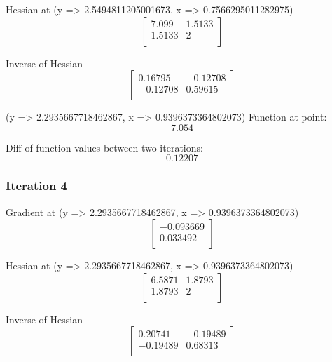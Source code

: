 \documentclass{article}
\begin{document}
Hessian at (y => 2.5494811205001673, x => 0.7566295011282975)
\begin{equation}
\left[
\begin{array}{cc}
7.099 & 1.5133 \\
1.5133 & 2 \\
\end{array}
\right]
\end{equation}

Inverse of Hessian
\begin{equation}
\left[
\begin{array}{cc}
0.16795 & -0.12708 \\
-0.12708 & 0.59615 \\
\end{array}
\right]
\end{equation}

(y => 2.2935667718462867, x => 0.9396373364802073)
Function at point:
\begin{equation}
7.054
\end{equation}

Diff of function values between two iterations:
\begin{equation}
0.12207
\end{equation}

\subsubsection{Iteration 4}
Gradient at (y => 2.2935667718462867, x => 0.9396373364802073)
\begin{equation}
\left[
\begin{array}{c}
-0.093669 \\
0.033492 \\
\end{array}
\right]
\end{equation}

Hessian at (y => 2.2935667718462867, x => 0.9396373364802073)
\begin{equation}
\left[
\begin{array}{cc}
6.5871 & 1.8793 \\
1.8793 & 2 \\
\end{array}
\right]
\end{equation}

Inverse of Hessian
\begin{equation}
\left[
\begin{array}{cc}
0.20741 & -0.19489 \\
-0.19489 & 0.68313 \\
\end{array}
\right]
\end{equation}
\end{document}
